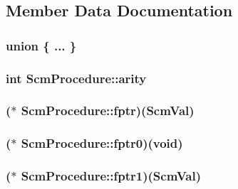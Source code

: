 \subsection{Member Data Documentation}
\hypertarget{struct_scm_procedure_ada1a4dc4263e0f49bae13a19f88a6ce1}{\subsubsection[{"@1}]{\setlength{\rightskip}{0pt plus 5cm}union \{ ... \} }}\label{struct_scm_procedure_ada1a4dc4263e0f49bae13a19f88a6ce1}
\hypertarget{struct_scm_procedure_adf8e6456c1100c93597a9c3e3184a1f5}{
\subsubsection[{arity}]{\setlength{\rightskip}{0pt plus 5cm}int Scm\-Procedure\-::arity}}\label{struct_scm_procedure_adf8e6456c1100c93597a9c3e3184a1f5}
\hypertarget{struct_scm_procedure_a9a14e2dfb4e36b531852d0f263f0c98a}{
\subsubsection[{fptr}]{($\ast$ Scm\-Procedure\-::fptr)({\bf Scm\-Val})}}\label{struct_scm_procedure_a9a14e2dfb4e36b531852d0f263f0c98a}
\hypertarget{struct_scm_procedure_a237b3cabee0b62a1379614f314b80b89}{
\subsubsection[{fptr0}]{($\ast$ Scm\-Procedure\-::fptr0)(void)}}\label{struct_scm_procedure_a237b3cabee0b62a1379614f314b80b89}
\hypertarget{struct_scm_procedure_a1451b1a1d4468548150a9a5fe47322cc}{
\subsubsection[{fptr1}]{($\ast$ Scm\-Procedure\-::fptr1)({\bf Scm\-Val})}}\label{struct_scm_procedure_a1451b1a1d4468548150a9a5fe47322cc}
